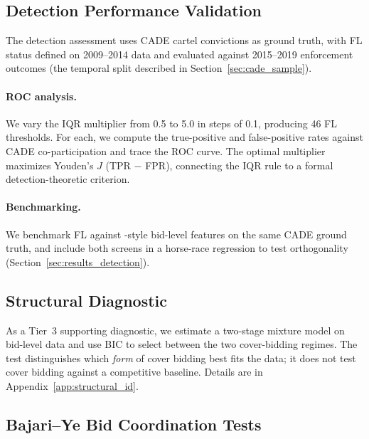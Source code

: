 
\subsection{Detection Performance Validation}
\label{sec:detection_validation}

The detection assessment uses CADE cartel convictions as ground truth,
with FL status defined on 2009--2014 data and evaluated against
2015--2019 enforcement outcomes (the temporal split described in
Section~\ref{sec:cade_sample}).

\paragraph{ROC analysis.}
We vary the IQR multiplier from 0.5 to 5.0 in steps of 0.1, producing
46 FL thresholds. For each, we compute the true-positive and
false-positive rates against CADE co-participation and trace the ROC
curve. The optimal multiplier maximizes Youden's $J$ (TPR $-$ FPR),
connecting the IQR rule to a formal detection-theoretic criterion.

\paragraph{Benchmarking.}
We benchmark FL against \citet{imhof2019detecting}-style bid-level
features on the same CADE ground truth, and include both screens in a
horse-race regression to test orthogonality
(Section~\ref{sec:results_detection}).


\subsection{Structural Diagnostic}
\label{sec:structural_estimation}

As a Tier~3 supporting diagnostic, we estimate a two-stage mixture
model on bid-level data and use BIC to select between the two
cover-bidding regimes. The test distinguishes which \emph{form} of
cover bidding best fits the data; it does not test cover bidding
against a competitive baseline. Details are in
Appendix~\ref{app:structural_id}.


\subsection{Bajari--Ye Bid Coordination Tests}
\label{sec:bajari_ye}

